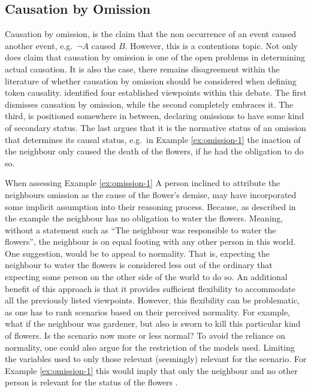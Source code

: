\documentclass[11pt,a4paper]{book}
\theoremstyle{definition}
\theoremstyle{definition}
\theoremstyle{definition}
\theoremstyle{remark}
\begin{document}
\subsection{Causation by Omission}
\label{subsec:omission}
Causation by omission, is the claim that the non occurrence of an event caused another event, e.g.\ $\neg A$ caused $B$.
However, this is a contentions topic. Not only does \parencite{blanchard2017cause} claim that causation by omission is one of the open problems in determining actual causation.
It is also the case, there remains disagreement within the literature of whether causation by omission should be considered when defining token causality.
\parencite{halpern2015graded} identified four established viewpoints within this debate.
The first dismisses causation by omission, while the second completely embraces it. 
The third, is positioned somewhere in between, declaring omissions to have some kind of secondary status.
The last argues that it is the normative status of an omission that determines its causal status, e.g.\ in Example \ref{ex:omission-1}
the inaction of the neighbour only caused the death of the flowers, if he had the obligation to do so.


When assessing Example \ref{ex:omission-1} 
A person inclined to attribute the neighbours omission as the cause of the flower's demise, may have incorporated some implicit assumption into their reasoning process.
Because, as described in the example the neighbour has no obligation to water the flowers. Meaning, without a statement such as ``The neighbour was responsible to water the flowers'', the neighbour
is on equal footing with any other person in this world. 
One suggestion, would be to appeal to normality. That is, expecting the neighbour to water the flowers is considered less out of the ordinary that expecting some person on the other side of the world to do so.
An additional benefit of this approach is that it provides sufficient flexibility to accommodate all the previously listed viewpoints. 
However, this flexibility can be problematic, as one has to rank scenarios based on their perceived normality. For example, what if the neighbour was gardener, but also is sworn to kill this particular kind of flowers. Is the scenario now more or less normal?
To avoid the reliance on normality, one could also argue for the restriction of the models used. Limiting the variables used to only those relevant (seemingly) relevant for the scenario.
For Example \ref{ex:omission-1} this would imply that only the neighbour and no other person is relevant for the status of the flowers \parencite{blanchard2017cause}.
\end{document}

